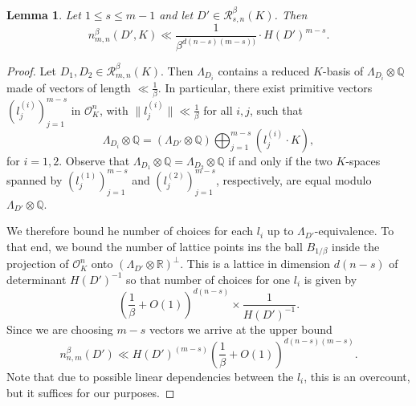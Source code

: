 \documentclass{amsart}
\newtheorem{lemma}[theorem]{Lemma}
\newcommand{\OK}{\mathcal{O}_K}
\newcommand{\Q}{\mathbb{Q}}
\begin{document}
\begin{lemma}\label{lemma1} Let $1\le s\le m-1$ and let $D'\in\mathcal{R}_{s,n}^{\beta}(K)$. Then$$n^{\beta}_{m,n}(D',K)\ll\frac{1}{\beta^{d(n-s)(m-s))}}\cdot H(D')^{m-s}.$$

	
\end{lemma}
\begin{proof}
	Let $D_1,D_2\in \mathcal{R}_{m,n}^{\beta}(K)$. Then $\Lambda_{D_i}$ contains a reduced $K$-basis of $\Lambda_{D_i}\otimes\Q$ made of vectors of length $\ll\tfrac{1}{\beta}$. In particular, there exist primitive vectors $(l_j^{(i)})_{j=1}^{m-s}$ in $\mathcal{O}_K^n$, with $\lVert l_j^{(i)}\rVert\ll\tfrac{1}{\beta}$ for all $i,j$, such that$$\Lambda_{D_i}\otimes\Q=(\Lambda_{D'}\otimes\Q)\bigoplus_{j=1}^{m-s}(l_j^{(i)}\cdot K), $$for $i=1,2$. Observe that $\Lambda_{D_1}\otimes\Q=\Lambda_{D_2}\otimes\Q$ if and only if the two $K$-spaces spanned by $(l_j^{(1)})_{j=1}^{m-s}$ and $(l_j^{(2)})_{j=1}^{m-s}$,  respectively, are equal modulo $\Lambda_{D'}\otimes\Q$.

We therefore bound he number of choices for each $l_i$ up to $\Lambda_{D'}$-equivalence. To that end, we bound the number of lattice points ins the ball $B_{1/\beta}$ inside the projection of $\OK^n$ onto $(\Lambda_{D'} \otimes \mathbb{R})^\perp$. This is a lattice in dimension $d(n-s)$ of determinant $H(D')^{-1}$ so that number of choices for one $l_i$ is given by $$\left(\frac{1}{\beta}+O(1)\right)^{d(n-s)} \times \frac{1}{H(D')^{-1}}.$$
Since we are choosing $m-s$ vectors we arrive at the upper bound
\begin{equation}
n^\beta_{n,m}(D') \ll H(D')^{(m-s)} \left(\frac{1}{\beta} +O(1) \right)^{d(n-s)(m-s)}.
\end{equation}
Note that due to possible linear dependencies between the $l_i$, this is an overcount, but it suffices for our purposes. 

\end{proof}
\end{document}
